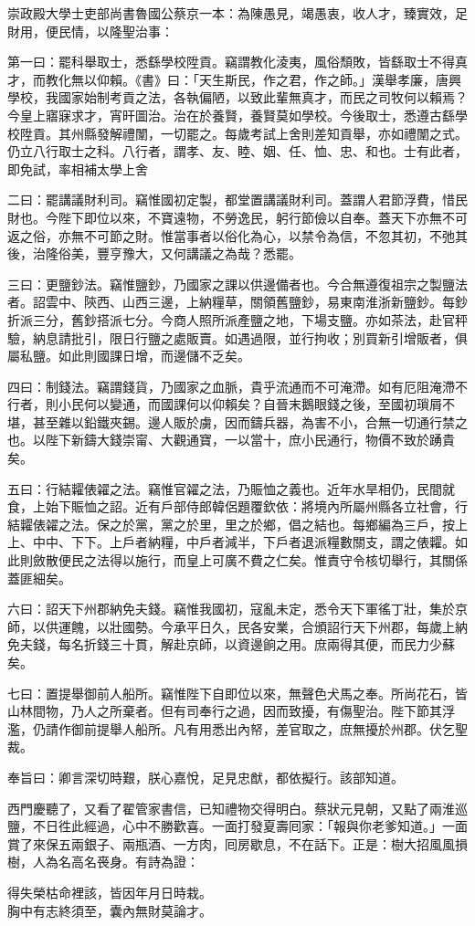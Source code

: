 \begin{myquote}[\markfont]
崇政殿大學士吏部尚書魯國公蔡京一本：為陳愚見，竭愚衷，收人才，臻實效，足財用，便民情，以隆聖治事：{}

第一曰：罷科舉取士，悉繇學校陞貢。竊謂教化淩夷，風俗頹敗，皆繇取士不得真才，而教化無以仰賴。《書》曰：「天生斯民，作之君，作之師。」漢舉孝廉，唐興學校，我國家始制考貢之法，各執偏陋，以致此輩無真才，而民之司牧何以賴焉？今皇上寤寐求才，宵旰圖治。治在於養賢，養賢莫如學校。今後取士，悉遵古繇學校陞貢。其州縣發解禮闈，一切罷之。每歲考試上舍則差知貢舉，亦如禮闈之式。仍立八行取士之科。八行者，謂孝、友、睦、姻、任、恤、忠、和也。士有此者，即免試，率相補太學上舍

二曰：罷講議財利司。竊惟國初定製，都堂置講議財利司。蓋謂人君節浮費，惜民財也。今陛下即位以來，不寶遠物，不勞逸民，躬行節儉以自奉。蓋天下亦無不可返之俗，亦無不可節之財。惟當事者以俗化為心，以禁令為信，不忽其初，不弛其後，治隆俗美，豐亨豫大，又何講議之為哉？悉罷。

三曰：更鹽鈔法。竊惟鹽鈔，乃國家之課以供邊備者也。今合無遵復祖宗之製鹽法者。詔雲中、陝西、山西三邊，上納糧草，關領舊鹽鈔，易東南淮浙新鹽鈔。每鈔折派三分，舊鈔搭派七分。今商人照所派產鹽之地，下場支鹽。亦如茶法，赴官秤驗，納息請批引，限日行鹽之處販賣。如遇過限，並行拘收；別買新引增販者，俱屬私鹽。如此則國課日增，而邊儲不乏矣。

四曰：制錢法。竊謂錢貨，乃國家之血脈，貴乎流通而不可淹滯。如有厄阻淹滯不行者，則小民何以變通，而國課何以仰賴矣？自晉末鵝眼錢之後，至國初瑣屑不堪，甚至雜以鉛鐵夾錫。邊人販於虜，因而鑄兵器，為害不小，合無一切通行禁之也。以陛下新鑄大錢崇甯、大觀通寶，一以當十，庶小民通行，物價不致於踴貴矣。

五曰：行結糶俵糴之法。竊惟官糴之法，乃賑恤之義也。近年水旱相仍，民間就食，上始下賑恤之詔。近有戶部侍郎韓侶題覆欽依：將境內所屬州縣各立社會，行結糶俵糴之法。保之於黨，黨之於里，里之於鄉，倡之結也。每鄉編為三戶，按上上、中中、下下。上戶者納糧，中戶者減半，下戶者退派糧數關支，謂之俵糶。如此則斂散便民之法得以施行，而皇上可廣不費之仁矣。惟責守令核切舉行，其關係蓋匪細矣。

六曰：詔天下州郡納免夫錢。竊惟我國初，寇亂未定，悉令天下軍徭丁壯，集於京師，以供運餽，以壯國勢。今承平日久，民各安業，合頒詔行天下州郡，每歲上納免夫錢，每名折錢三十貫，解赴京師，以資邊餉之用。庶兩得其便，而民力少蘇矣。

七曰：置提舉御前人船所。竊惟陛下自即位以來，無聲色犬馬之奉。所尚花石，皆山林間物，乃人之所棄者。但有司奉行之過，因而致擾，有傷聖治。陛下節其浮濫，仍請作御前提舉人船所。凡有用悉出內帑，差官取之，庶無擾於州郡。伏乞聖裁。{}

奉旨曰：卿言深切時艱，朕心嘉悅，足見忠猷，都依擬行。該部知道。
\end{myquote}

西門慶聽了，又看了翟管家書信，已知禮物交得明白。蔡狀元見朝，又點了兩淮巡鹽，不日徃此經過，心中不勝歡喜。一面打發夏壽囘家：「報與你老爹知道。」一面賞了來保五兩銀子、兩瓶酒、一方肉，囘房歇息，不在話下。正是：樹大招風風損樹，人為名高名䘮身。有詩為證：

\begin{myquote}
得失榮枯命裡該，皆因年月日時栽。\\胸中有志終須至，囊內無財莫論才。
\end{myquote}
